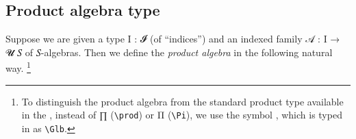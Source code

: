 \subsection{Product algebra type}\label{ssec:product-algebra-type}
Suppose we are given a type \ab I \as : \ab 𝓘 (of ``indices'') and an indexed family \ab 𝒜 \as : \ab I \as →  \ab 𝓤 \ab 𝑆 of \ab 𝑆-algebras. Then we define the \emph{product algebra}
 
in the following natural way.%
%
\footnote{To distinguish the product algebra from the standard product type available in the \agdastdlib, instead of \af ∏ (\texttt{\textbackslash prod}) or \af Π (\texttt{\textbackslash Pi}), we use the symbol , which is typed in \agdamode as \texttt{\textbackslash Glb}.}%
%
\ccpad
